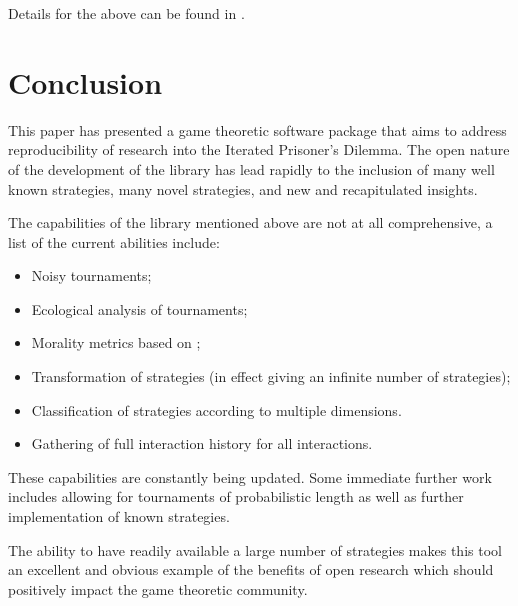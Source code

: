\documentclass{article}
\begin{document}
Details for the above can be found in \cite{Harper2015}.

\section{Conclusion}\label{sec:conclusion}

This paper has presented a game theoretic software package that aims to address
reproducibility of research into the Iterated Prisoner's Dilemma. The open
nature of the development of the library has lead rapidly to the inclusion of
many well known strategies, many novel strategies, and new and recapitulated
insights.

The capabilities of the library mentioned above are not at all comprehensive, a
list of the current abilities include:

\begin{itemize}
    \item Noisy tournaments;
    \item Ecological analysis of tournaments;
    \item Morality metrics based on \cite{Singer-Clark2014};
    \item Transformation of strategies (in effect giving an infinite number of
        strategies);
    \item Classification of strategies according to multiple dimensions.
    \item Gathering of full interaction history for all interactions.
\end{itemize}

These capabilities are constantly being updated. Some immediate further work
includes allowing for tournaments of probabilistic length as well as further
implementation of known strategies.

The ability to have readily available a large number of strategies makes this
tool an excellent and obvious example of the benefits of open research which
should positively impact the game theoretic community.

\printbibliography
\end{document}
